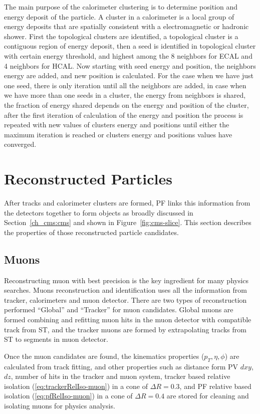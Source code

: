 The main purpose of the calorimeter clustering is to determine position and
energy deposit of the particle. A cluster in a calorimeter is a local group of
energy deposits that are spatially consistent with a electromagnetic
or hadronic shower. First the topological
clusters are identified, a topological cluster is a contiguous region of energy
deposit, then a seed is identified in topological cluster with certain energy
threshold, and highest among the 8 neighbors for \gls{ECAL} and 4 neighbors for \gls{HCAL}.
Now starting with seed energy and position, the neighbors energy are added, and
new position is calculated. For the case when we have just one seed, there is only
iteration until all the neighbors are added, in case when we have more than one seeds
in a cluster, the energy from neighbors is shared, the fraction of energy shared
depends on the energy and position of the cluster, after the first
iteration of calculation of the energy and position the
process is repeated with new values of clusters energy and
positions until either the maximum iteration is reached or clusters energy and positions
values have converged.

\section{
  Reconstructed Particles
 }

After tracks and calorimeter clusters are formed, \gls{PF} links this information
from the detectors together to form objects as broadly discussed in
Section~\ref{ch_cms:cms} and shown in Figure~\ref{fig:cms-slice}. This section
describes the properties of those reconstructed particle candidates.

\subsection{
  Muons
}

Reconstructing muon with best precision is the key ingredient for many physics
searches. Muons reconstruction and identification uses all the information from tracker,
calorimeters and muon detector. There are two types of reconstruction performed
``Global'' and ``Tracker'' for muon candidates. Global muons are formed combining and refitting
muon hits in the muon detector with compatible track from \gls{ST}, and the tracker muons
are formed by extrapolating tracks from \gls{ST} to segments in muon detector.

Once the muon candidates are found, the kinematics properties (\( p_T, \eta, \phi \))
are calculated from track fitting, and other properties such as distance form
\gls{PV} \( dxy \), \( dz \), number of hits in the tracker and muon system, tracker
based relative isolation (\ref{eq:trackerRelIso-muon}) in a cone of \( \Delta R = 0.3 \), and
\gls{PF} relative based isolation (\ref{eq:pfRelIso-muon})
in a cone of \( \Delta R = 0.4 \) are stored for cleaning and isolating muons for
physics analysis.

